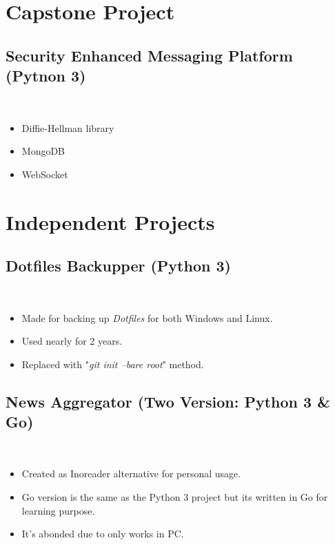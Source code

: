 \documentclass[a4paper, 9pt]{extarticle}
\begin{document}
\maketitle{}
\myeducation{}
\myexperience{}

\section{Capstone Project}
\subsection{Security Enhanced Messaging Platform (Pytnon 3)} \hfill \\
\begin{itemize}
    \item Diffie-Hellman library
    \item MongoDB
    \item WebSocket
\end{itemize}

\section{Independent Projects}
\subsection{Dotfiles Backupper (Python 3)} \hfill \\
\begin{itemize}
    \item Made for backing up \emph{Dotfiles} for both Windows and Linux.
    \item Used nearly for 2 years.
    \item Replaced with "\emph{git init --bare root}" method.
\end{itemize}

\subsection{News Aggregator (Two Version: Python 3 \& Go)} \hfill \\
\begin{itemize}
    \item Created as Inoreader alternative for personal usage.
	\item Go version is the same as the Python 3 project but its written in Go for learning purpose.
    \item It's abonded due to only works in PC.
\end{itemize}
\end{document}
